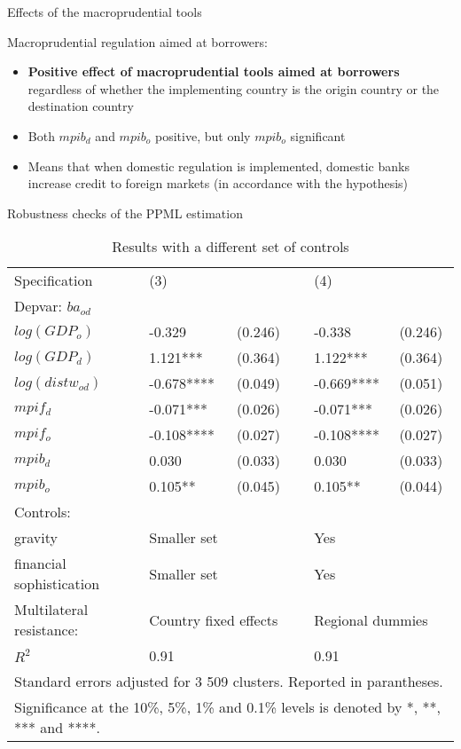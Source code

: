 \documentclass{beamer}
\begin{document}
\begin{frame}{Effects of the macroprudential tools}
    \begin{block}{Macroprudential regulation aimed at borrowers:}
    \begin{itemize}
        \item \textbf{Positive effect of macroprudential tools aimed at borrowers} regardless of whether the implementing country is the origin country or the destination country
        \item Both $mpib_{d}$ and $mpib_{o}$ positive, but only $mpib_{o}$ significant
        \item Means that when domestic regulation is implemented, domestic banks increase credit to foreign markets (in accordance with the hypothesis)
    \end{itemize}
    \end{block}
\end{frame}


\begin{frame}{Robustness checks of the PPML estimation}
\begin{table}[!h]
\tiny
\centering
\begin{tabular}{ l l l l l l}
\hline
Specification&(3)&&&(4)& \\
Depvar: $ba_{od}$&&&&&\\
\hline
$log(GDP_{o})$&-0.329&(0.246)&&-0.338&(0.246)\\
$log(GDP_{d})$&1.121***&(0.364)&&1.122***&(0.364)\\
$log(distw_{od})$&-0.678****&(0.049)&&-0.669****&(0.051)\\
$mpif_{d}$&-0.071***&(0.026)&&-0.071***&(0.026)\\
$mpif_{o}$&-0.108****&(0.027)&&-0.108****&(0.027)\\
$mpib_{d}$&0.030&(0.033)&&0.030&(0.033)\\
$mpib_{o}$&0.105**&(0.045)&&0.105**&(0.044)\\
Controls:&&&&&\\
gravity &Smaller set&&&Yes& \\ 
financial sophistication &Smaller set&&&Yes& \\
Multilateral resistance: & \multicolumn{2}{l}{Country fixed effects} && \multicolumn{2}{l}{Regional dummies} \\
\hline
$R^2$&0.91&&&0.91&\\
\hline
\multicolumn{6}{l}{Standard errors adjusted for 3 509 clusters. Reported in parantheses. }\\
\hline
\multicolumn{6}{l}{\tiny Significance at the 10\%, 5\%, 1\% and 0.1\% levels is denoted by *, **, *** and ****.}\\
\end{tabular}
\caption{Results with a different set of controls}
\label{tab:robust1}
\end{table}
\end{frame}
\end{document}
